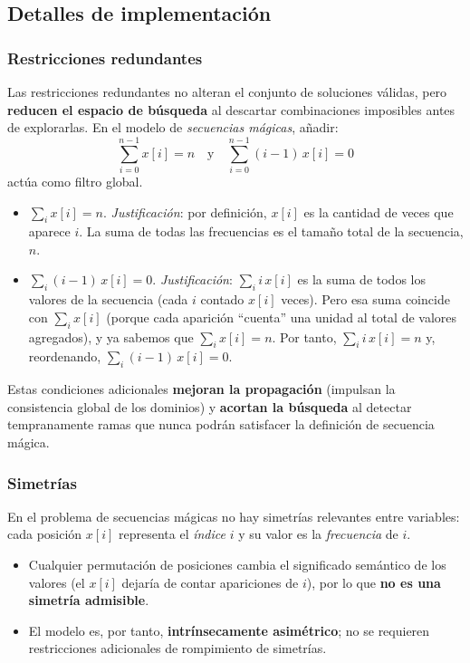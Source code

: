 
\subsection{Detalles de implementación}\label{sec:04-acertijo-logico-impl}
\subsubsection*{Restricciones redundantes}
Las restricciones redundantes no alteran el conjunto de soluciones válidas, pero \textbf{reducen el espacio de búsqueda} al descartar combinaciones imposibles antes de explorarlas.  
En el modelo de \emph{secuencias mágicas}, añadir:
\[
\sum_{i=0}^{n-1} x[i] = n
\quad\text{y}\quad
\sum_{i=0}^{n-1} (i-1)\,x[i] = 0
\]
actúa como filtro global.

\begin{itemize}
  \item \(\displaystyle \sum_i x[i] = n\). \textit{Justificación}: por definición, \(x[i]\) es la cantidad de veces que aparece \(i\). La suma de todas las frecuencias es el tamaño total de la secuencia, \(n\).
  \item \(\displaystyle \sum_i (i-1)\,x[i] = 0\). \textit{Justificación}: \(\sum_i i\,x[i]\) es la suma de todos los valores de la secuencia (cada \(i\) contado \(x[i]\) veces). Pero esa suma coincide con \(\sum_i x[i]\) (porque cada aparición “cuenta” una unidad al total de valores agregados), y ya sabemos que \(\sum_i x[i]=n\). Por tanto, \(\sum_i i\,x[i]=n\) y, reordenando, \(\sum_i (i-1)\,x[i]=0\).
\end{itemize}

Estas condiciones adicionales \textbf{mejoran la propagación} (impulsan la consistencia global de los dominios) y \textbf{acortan la búsqueda} al detectar tempranamente ramas que nunca podrán satisfacer la definición de secuencia mágica.

\subsubsection*{Simetrías}
En el problema de secuencias mágicas no hay simetrías relevantes entre variables: cada posición \(x[i]\) representa el \emph{índice} \(i\) y su valor es la \emph{frecuencia} de \(i\).  
\begin{itemize}
  \item Cualquier permutación de posiciones cambia el significado semántico de los valores (el \(x[i]\) dejaría de contar apariciones de \(i\)), por lo que \textbf{no es una simetría admisible}.
  \item El modelo es, por tanto, \textbf{intrínsecamente asimétrico}; no se requieren restricciones adicionales de rompimiento de simetrías.
\end{itemize}
